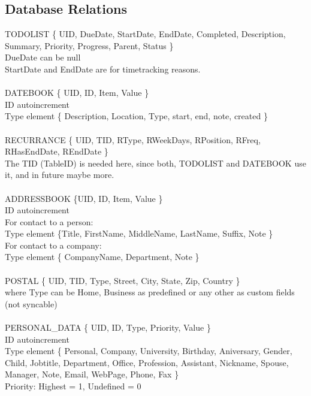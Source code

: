 
\pagebreak

\subsection{Database Relations}
TODOLIST \{ UID, DueDate, StartDate, EndDate, Completed, Description, Summary, Priority, Progress, Parent, Status \}\\
DueDate can be null \\
StartDate and EndDate are for timetracking reasons.
\\
\\
\noindent
DATEBOOK \{ UID, ID, Item, Value \}\\
ID autoincrement\\
Type element \{ Description, Location, Type, start, end, note, created \}\\
\\
\noindent
RECURRANCE \{ UID, TID, RType, RWeekDays, RPosition, RFreq, RHasEndDate, REndDate \} \\
The TID (TableID) is needed here, since both, TODOLIST and DATEBOOK use it, and in future maybe more.\\
\\
\noindent
ADDRESSBOOK \{UID, ID, Item, Value \}\\
ID autoincrement\\
For contact to a person:\\
Type element \{Title, FirstName, MiddleName, LastName, Suffix, Note \}\\  
For contact to a company:\\
Type element \{ CompanyName, Department, Note \}\\
\\
\noindent
POSTAL \{ UID, TID, Type, Street, City, State, Zip, Country \} \\
where Type can be Home, Business as predefined or any other as custom fields (not syncable) \\
\\
\noindent
PERSONAL\_DATA \{ UID, ID, Type, Priority, Value \}\\
ID autoincrement \\
Type element \{ Personal, Company, University,  Birthday, Aniversary,  Gender, Child, Jobtitle, Department, 
Office, Profession, Assistant, Nickname, Spouse, Manager, Note, Email, WebPage, Phone, Fax \}\\
Priority: Highest = 1, Undefined = 0\\
\\ 
\noindent
